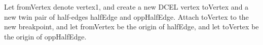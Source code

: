 Let \textsf{fromVertex} denote \textsf{vertex1}, and create a new DCEL vertex \textsf{toVertex} and a new twin pair of half-edges \textsf{halfEdge} and \textsf{oppHalfEdge}. Attach \textsf{toVertex} to the new breakpoint, and let \textsf{fromVertex} be the origin of \textsf{halfEdge}, and let \textsf{toVertex} be the origin of \textsf{oppHalfEdge}.
